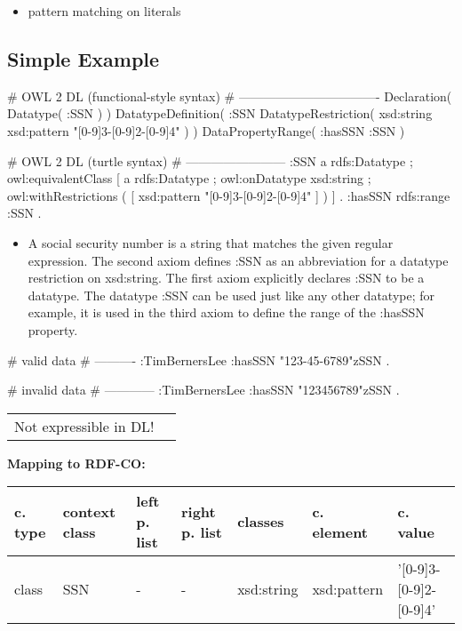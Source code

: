 \documentclass{llncs}
\newenvironment{gcotable}{
  \scriptsize
  \sffamily
  \vspace{0cm}
	\begin{center}
	\textbf{\vspace{0.4cm}Mapping to RDF-CO:} \\
  \begin{tabular}{l|l|l|l|l|l|l}
	\hline
  \textbf{c. type} & \textbf{context class} & \textbf{left p. list} & \textbf{right p. list} & \textbf{classes} & \textbf{c. element} & \textbf{c. value} \\
  \hline

}{
  \hline
  \end{tabular}
	\end{center}
}
\newenvironment{DL}{
  \vspace{0cm}
	\begin{center}
  \begin{tabular}{r l}

}{
  \end{tabular}
	\end{center}
}
\begin{document}
\begin{itemize}
	\item pattern matching on literals
\end{itemize}

\subsection{Simple Example}

\begin{ex}
# OWL 2 DL (functional-style syntax)
# ----------------------------------
Declaration( Datatype( :SSN ) ) 
DatatypeDefinition( 
    :SSN
    DatatypeRestriction( xsd:string xsd:pattern "[0-9]{3}-[0-9]{2}-[0-9]{4}" ) )     
DataPropertyRange( :hasSSN :SSN ) 
\end{ex}

\begin{ex}
# OWL 2 DL (turtle syntax)
# ------------------------
:SSN 
    a rdfs:Datatype ;
    owl:equivalentClass [
        a rdfs:Datatype ;
        owl:onDatatype xsd:string ;
        owl:withRestrictions ( 
            [ xsd:pattern "[0-9]{3}-[0-9]{2}-[0-9]{4}" ] ) ] .
:hasSSN rdfs:range :SSN .
\end{ex}

\begin{itemize}
	\item A social security number is a string that matches the given regular expression. 
The second axiom defines :SSN as an abbreviation for a datatype restriction on xsd:string. 
The first axiom explicitly declares :SSN to be a datatype. 
The datatype :SSN can be used just like any other datatype; 
for example, it is used in the third axiom to define the range of the :hasSSN property. 
\end{itemize}

\begin{ex}
# valid data
# ----------
:TimBernersLee
    :hasSSN "123-45-6789"^^:SSN .
\end{ex}

\begin{ex}
# invalid data
# ------------
:TimBernersLee
    :hasSSN "123456789"^^:SSN .
\end{ex}

\begin{DL}
Not expressible in DL!
\end{DL}

\begin{gcotable}
class & SSN & - & - & xsd:string & xsd:pattern & '[0-9]{3}-[0-9]{2}-[0-9]{4}' \\
\end{gcotable}
\end{document}
